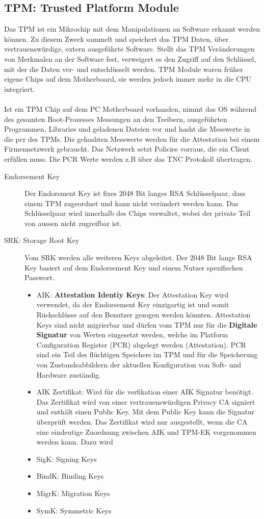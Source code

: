 \subsection{TPM: Trusted Platform Module}\label{sec:tpm} 
Das TPM ist ein Mikrochip mit dem Manipulationen an Software erkannt werden können. Zu diesem Zweck sammelt und speichert das TPM Daten, über vertrauenswürdige, extern ausgeführte Software. Stellt das TPM Veränderungen von Merkmalen an der Software fest, verweigert es den Zugriff auf den Schlüssel, mit der die Daten ver- und entschlüsselt werden. TPM Module waren früher eigene Chips auf dem Motherboard, sie werden jedoch immer mehr in die CPU integriert. \\\\
Ist ein TPM Chip auf dem PC Motherboard vorhanden, nimmt das OS während des gesamten Boot-Prozesses Messungen an den Treibern, ausgeführten Programmen, Libraries und geladenen Dateien vor und hasht die Messwerte in die \gls{pcr} des TPMs. Die gehashten Messwerte werden für die Attestation bei einem Firmennetzwerk gebraucht. Das Netzwerk setzt Policies vorraus, die ein Client erfüllen muss. Die PCR Werte werden z.B über das TNC Protokoll übertragen. 

\begin{description}
	\item[Endorsement Key] Der Endorsment Key ist fixes 2048 Bit langes RSA Schlüsselpaar, dass einem TPM zugeordnet und kann nicht verändert werden kann. Das Schlüsselpaar wird innerhalb des Chips verwaltet, wobei der private Teil von aussen nicht zugreifbar ist. 
	\item[SRK: Storage Root Key] Vom SRK werden alle weiteren Keys abgeleitet. Der 2048 Bit lange RSA Key basiert auf dem Endorsement Key und einem Nutzer spezifischen Passwort. 
	\begin{itemize}
		\item AIK: \textbf{Attestation Identiy Keys}: Der Attestation Key wird verwendet, da der Endorsement Key einzigartig ist und somit Rückschlüsse auf den Benutzer gezogen werden könnten. Attestation Keys sind nicht migrierbar und dürfen vom TPM nur für die \textbf{Digitale Signatur} von Werten eingesetzt werden, welche im Platform Configuration Register (PCR) abgelegt werden (Attestation). PCR sind ein Teil des flüchtigen Speichers im TPM und für die Speicherung von Zustandsabbildern der aktuellen Konfiguration von Soft- und Hardware zuständig.
		\item AIK Zertifikat: Wird für die verfikation einer AIK Signatur benötigt. Das Zertifikat wird von einer vertrauenswürdigen Privacy CA signiert und enthält einen Public Key. Mit dem Public Key kann die Signatur überprüft werden. Das Zertifikat wird nur ausgestellt, wenn die CA eine eindeutige Zuordnung zwischen AIK und TPM-EK vorgenommen werden kann. Dazu wird 
		\item SigK: Signing Keys
		\item BindK: Binding Keys
		\item MigrK: Migration Keys
		\item SymK: Symmetric Keys
	\end{itemize}
\end{description}

